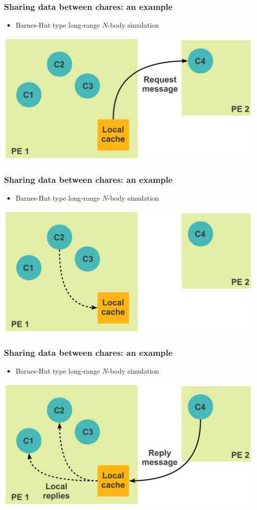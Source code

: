 \begin{frame}[fragile]
  \frametitle{Sharing data between chares: an example}
  \begin{itemize}
    \item Barnes-Hut type long-range $N$-body simulation
  \end{itemize}
  \includegraphics[width=\textwidth]{figures/advancedOpts/fig5}
\end{frame}

\begin{frame}[fragile]
  \frametitle{Sharing data between chares: an example}
  \begin{itemize}
    \item Barnes-Hut type long-range $N$-body simulation
  \end{itemize}
  \includegraphics[width=\textwidth]{figures/advancedOpts/fig6}
\end{frame}

\begin{frame}[fragile]
  \frametitle{Sharing data between chares: an example}
  \begin{itemize}
    \item Barnes-Hut type long-range $N$-body simulation
  \end{itemize}
  \includegraphics[width=\textwidth]{figures/advancedOpts/fig7}
\end{frame}

